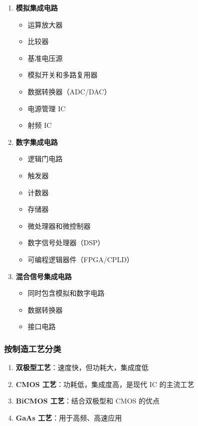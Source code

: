 \begin{enumerate}
  \item \textbf{模拟集成电路}
    \begin{itemize}
      \item 运算放大器
      \item 比较器
      \item 基准电压源
      \item 模拟开关和多路复用器
      \item 数据转换器（ADC/DAC）
      \item 电源管理 IC
      \item 射频 IC
    \end{itemize}

  \item \textbf{数字集成电路}
    \begin{itemize}
      \item 逻辑门电路
      \item 触发器
      \item 计数器
      \item 存储器
      \item 微处理器和微控制器
      \item 数字信号处理器（DSP）
      \item 可编程逻辑器件（FPGA/CPLD）
    \end{itemize}

  \item \textbf{混合信号集成电路}
    \begin{itemize}
      \item 同时包含模拟和数字电路
      \item 数据转换器
      \item 接口电路
    \end{itemize}
\end{enumerate}

\subsubsection{按制造工艺分类}

\begin{enumerate}
  \item \textbf{双极型工艺}：速度快，但功耗大，集成度低
  \item \textbf{CMOS 工艺}：功耗低，集成度高，是现代 IC 的主流工艺
  \item \textbf{BiCMOS 工艺}：结合双极型和 CMOS 的优点
  \item \textbf{GaAs 工艺}：用于高频、高速应用
\end{enumerate}

